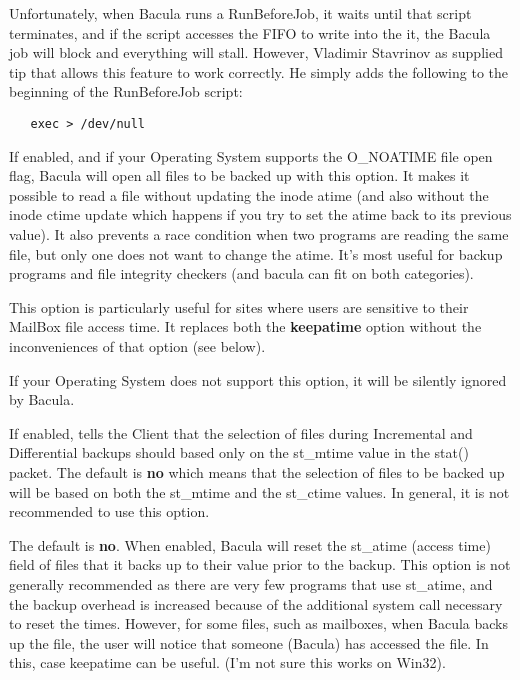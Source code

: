 \begin{description}
   Unfortunately, when Bacula runs a RunBeforeJob, it waits until that
   script terminates, and if the script accesses the FIFO to write   
   into the it, the Bacula job will block and everything will stall.
   However, Vladimir Stavrinov as supplied tip that allows this feature   
   to work correctly.  He simply adds the following to the beginning
   of the RunBeforeJob script:

\begin{verbatim}
   exec > /dev/null
\end{verbatim}

\item [noatime=yes\vb{}no]
   If enabled, and if your Operating System supports the O\_NOATIME file
   open flag, Bacula will open all files to be backed up with this option.
   It makes it possible to read a file without updating the inode atime
   (and also without the inode ctime update which happens if you try to set
   the atime back to its previous value).  It also prevents a race
   condition when two programs are reading the same file, but only one does
   not want to change the atime.  It's most useful for backup programs and
   file integrity checkers (and bacula can fit on both categories).

   This option is particularly useful for sites where users are sensitive
   to their MailBox file access time.  It replaces both the {\bf keepatime}
   option without the inconveniences of that option (see below).

   If your Operating System does not support this option, it will be
   silently ignored by Bacula.


\item [mtimeonly=yes\vb{}no]
   If enabled, tells the Client that the selection of files during
   Incremental and Differential backups should based only on the st\_mtime
   value in the stat() packet.  The default is {\bf no} which means that
   the selection of files to be backed up will be based on both the
   st\_mtime and the st\_ctime values.  In general, it is not recommended
   to use this option.

\item [keepatime=yes\vb{}no]
   The default is {\bf no}.  When enabled, Bacula will reset the st\_atime
   (access time) field of files that it backs up to their value prior to
   the backup.  This option is not generally recommended as there are very
   few programs that use st\_atime, and the backup overhead is increased
   because of the additional system call necessary to reset the times.
   However, for some files, such as mailboxes, when Bacula backs up the
   file, the user will notice that someone (Bacula) has accessed the
   file. In this, case keepatime can be useful.
   (I'm not sure this works on Win32).


\end{description}
